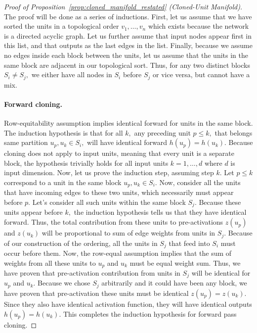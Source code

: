 \documentclass{article}
\numberwithin{figure}{section}
\begin{document}
\begin{proof}[Proof of Proposition~\ref{prop:cloned_manifold_restated} (Cloned-Unit Manifold)]
The proof will be done as a series of inductions. 
First, let us assume that we have sorted the units in a topological order $v_1,\dots, v_n$ which exists because the network is a directed acyclic graph. Let us further assume that input nodes appear first in this list, and that outputs as the last edges in the list. Finally, because we assume no edges inside each block between the units, let us assume that the units in the same block are adjacent in our topological sort. Thus, for any two distinct blocks $S_i\neq S_j,$ we either have all nodes in $S_i$ before $S_j$ or vice versa, but cannot have a mix. 

\paragraph{Forward cloning.} Row-equitability assumption implies identical forward for units in the same block. The induction hypothesis is that for all $k,$ any preceding unit $p \le k,$ that belongs same partition  $ u_p, u_k \in S_i ,$  will have identical forward $h(u_p) = h(u_k). $ Because cloning does not apply to input units, meaning that every unit is a separate block, the hypothesis trivially holds for all input units $k=1,\dots, d$ where $d$ is input dimension. Now, let us prove the induction step, assuming step $k.$ Let $p\le k$ correspond to a unit in the same block $u_p,u_k  \in S_i. $ Now, consider all the units that have incoming edges to these two units, which necessarily must appear before $p$. Let's consider all such units within the same block $S_j.$ Because these units appear before $k,$ the induction hypothesis tells us that they have identical forward. Thus, the total contribution from these units to pre-activations $z(u_p)$ and $z(u_k)$ will be proportional to sum of edge weights from units in $S_j$. Because of our construction of the ordering, all the units in $S_j$ that feed into $S_i$ must occur before them. 
Now, the row-equal assumption implies that the sum of weights from all these units to $u_p $ and $u_k$ must be equal weight sum. Thus, we have proven that pre-activation contribution from units in  $S_j$ will be identical for $u_p$ and $u_k$. Because we chose $S_j$ arbitrarily and it could have been any block, we have proven that pre-activation these units must be identical $z(u_p)=z(u_k)$. Since they also have identical activation function, they will have identical outputs $h(u_p)=h(u_k)$. This completes the induction hypothesis for forward pass cloning. 


\end{proof}
\end{document}
